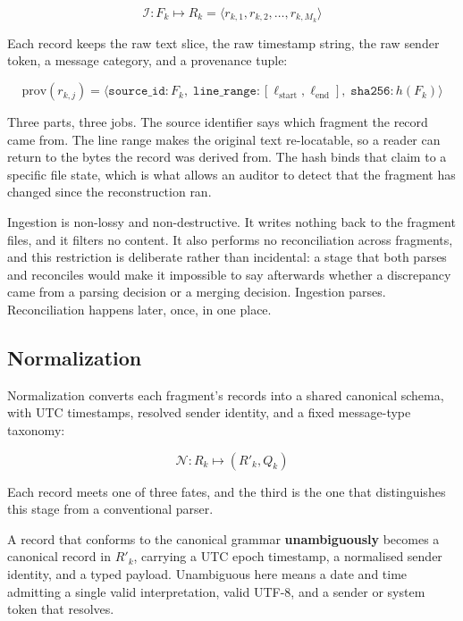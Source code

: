 \begin{equation}
  \mathcal{I}: F_k \mapsto R_k
  = \langle r_{k,1}, r_{k,2}, \dots, r_{k,M_k} \rangle
\end{equation}

Each record keeps the raw text slice, the raw timestamp string, the raw sender
token, a message category, and a provenance tuple:

\begin{equation}
  \mathrm{prov}(r_{k,j}) = \big\langle
    \texttt{source\_id}: F_k,\;
    \texttt{line\_range}: [\ell_{\text{start}}, \ell_{\text{end}}],\;
    \texttt{sha256}: h(F_k)
  \big\rangle
  \label{eq:prov}
\end{equation}

Three parts, three jobs. The source identifier says which fragment the record
came from. The line range makes the original text re-locatable, so a reader can
return to the bytes the record was derived from. The hash binds that claim to a
specific file state, which is what allows an auditor to detect that the fragment
has changed since the reconstruction ran.

Ingestion is non-lossy and non-destructive. It writes nothing back to the
fragment files, and it filters no content. It also performs no reconciliation
across fragments, and this restriction is deliberate rather than incidental: a
stage that both parses and reconciles would make it impossible to say afterwards
whether a discrepancy came from a parsing decision or a merging decision.
Ingestion parses. Reconciliation happens later, once, in one place.

\subsection{Normalization}
\label{sec:carta:normalization}

Normalization converts each fragment's records into a shared canonical schema,
with UTC timestamps, resolved sender identity, and a fixed message-type taxonomy:

\begin{equation}
  \mathcal{N}: R_k \mapsto (R'_k, Q_k)
\end{equation}

Each record meets one of three fates, and the third is the one that distinguishes
this stage from a conventional parser.

A record that conforms to the canonical grammar \textbf{unambiguously} becomes a
canonical record in $R'_k$, carrying a UTC epoch timestamp, a normalised sender
identity, and a typed payload. Unambiguous here means a date and time admitting a
single valid interpretation, valid UTF-8, and a sender or system token that
resolves.


